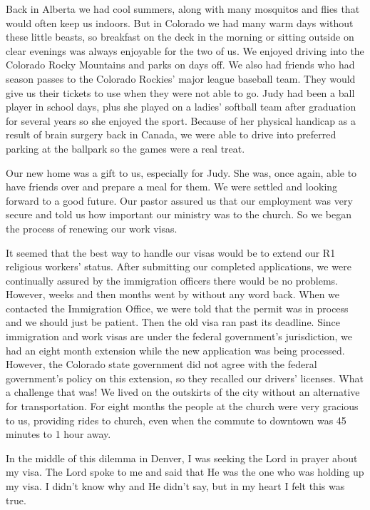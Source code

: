 \documentclass[twoside, 12pt]{book}
\begin{document}
Back in Alberta we had cool summers, along with many mosquitos and flies that would often keep us indoors. But in Colorado we had many warm days without these little beasts, so breakfast on the deck in the morning or sitting outside on clear evenings was always enjoyable for the two of us. We enjoyed driving into the Colorado Rocky Mountains and parks on days off. We also had friends who had season passes to the Colorado Rockies’ major league baseball team. They would give us their tickets to use when they were not able to go. Judy had been a ball player in school days, plus she played on a ladies’ softball team after graduation for several years so she enjoyed the sport. Because of her physical handicap as a result of brain surgery back in Canada, we were able to drive into preferred parking at the ballpark so the games were a real treat. 

Our new home was a gift to us, especially for Judy. She was, once again, able to have friends over and prepare a meal for them. We were settled and looking forward to a good future. Our pastor assured us that our employment was very secure and told us how important our ministry was to the church. So we began the process of renewing our work visas.

It seemed that the best way to handle our visas would be to extend our R1 religious workers’ status. After submitting our completed applications, we were continually assured by the immigration officers there would be no problems. However, weeks and then months went by without any word back. When we contacted the Immigration Office, we were told that the permit was in process and we should just be patient. Then the old visa ran past its deadline. Since immigration and work visas are under the federal government’s jurisdiction, we had an eight month extension while the new application was being processed. However, the Colorado state government did not agree with the federal government’s policy on this extension, so they recalled our drivers’ licenses. What a challenge that was!  We lived on the outskirts of the city without an alternative for transportation. For eight months the people at the church were very gracious to us, providing rides to church, even when the commute to downtown was 45 minutes to 1 hour away.

In the middle of this dilemma in Denver, I was seeking the Lord in prayer about my visa. The Lord spoke to me and said that He was the one who was holding up my visa. I didn’t know why and He didn’t say, but in my heart I felt this was true.
\end{document}

